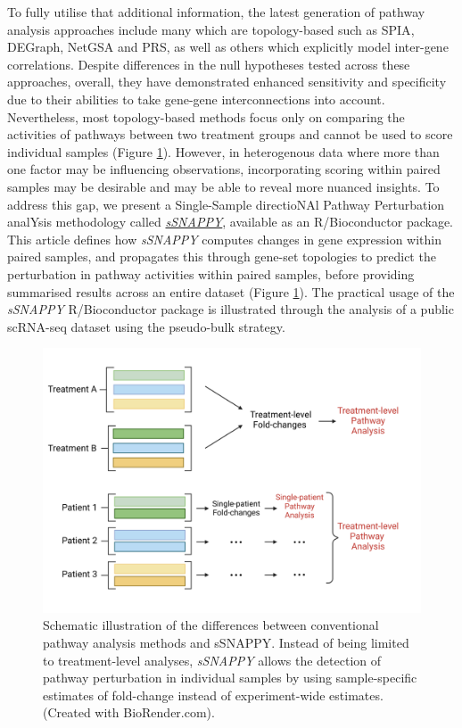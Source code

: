 \documentclass[9pt,a4paper,]{extarticle}
\begin{document}
To fully utilise that additional information, the latest generation of pathway analysis approaches include many which are topology-based such as SPIA\citep{Tarca2009}, DEGraph\citep{Jacob2012}, NetGSA\citep{Ma2016} and PRS\citep{Ibrahim2012}, as well as others which explicitly model inter-gene correlations\citep{Wu2012}.
Despite differences in the null hypotheses tested across these approaches, overall, they have demonstrated enhanced sensitivity and specificity due to their abilities to take gene-gene interconnections into account\citep{Nguyen2019-va, Ma2019}.
Nevertheless, most topology-based methods focus only on comparing the activities of pathways between two treatment groups and cannot be used to score individual samples (Figure \ref{fig:Figure1}).
However, in heterogenous data where more than one factor may be influencing observations\citep{Hanzelmann2013}, incorporating scoring within paired samples may be desirable and may be able to reveal more nuanced insights.
To address this gap, we present a Single-Sample directioNAl Pathway Perturbation analYsis methodology called \href{https://bioconductor.org/packages/sSNAPPY}{\emph{sSNAPPY}}, available as an R/Bioconductor package.
This article defines how \emph{sSNAPPY} computes changes in gene expression within paired samples, and propagates this through gene-set topologies to predict the perturbation in pathway activities within paired samples, before providing summarised results across an entire dataset (Figure \ref{fig:Figure1}).
The practical usage of the \emph{sSNAPPY} R/Bioconductor package is illustrated through the analysis of a public scRNA-seq dataset using the pseudo-bulk strategy.

\begin{figure}[h]

{\centering \includegraphics[width=1\linewidth]{sSNAPPY_paper_files/figure-latex/Figure1} 

}

\caption{Schematic illustration of the differences between conventional pathway analysis methods and sSNAPPY. Instead of being limited to treatment-level analyses, \textit{sSNAPPY} allows the detection of pathway perturbation in individual samples by using sample-specific estimates of fold-change instead of experiment-wide estimates. (Created with BioRender.com).}\label{fig:Figure1}
\end{figure}
\end{document}
